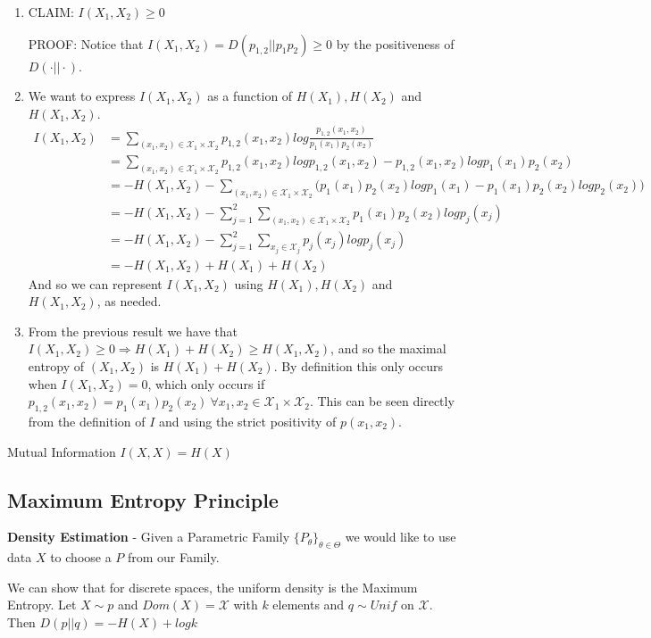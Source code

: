 \documentclass[]{article}
\begin{document}
\begin{enumerate}
	\item CLAIM: \(I(X_1,X_2)\ge 0\)
	
	PROOF: Notice that \(I(X_1,X_2) = D(p_{1,2}||p_1p_2) \ge 0\) by the positiveness of \(D(\cdot||\cdot)\).
	
	\item We want to express  \(I(X_1,X_2)\) as a function of \(H(X_1), H(X_2)\) and \(H(X_1,X_2)\).
	\begin{align*}
	I(X_1,X_2) &= \sum_{(x_1,x_2)\in\mathcal{X}_1\times\mathcal{X}_2}p_{1,2}(x_1,x_2)log\frac{p_{1,2}(x_1,x_2)}{p_1(x_1)p_2(x_2)} \\
	&=\sum_{(x_1,x_2)\in\mathcal{X}_1\times\mathcal{X}_2}p_{1,2}(x_1,x_2)logp_{1,2}(x_1,x_2)-p_{1,2}(x_1,x_2)logp_1(x_1)p_2(x_2)\\
	&=-H(X_1,X_2) - \sum_{(x_1,x_2)\in\mathcal{X}_1\times\mathcal{X}_2}\bigg( p_1(x_1)p_2(x_2)logp_1(x_1) - p_1(x_1)p_2(x_2)logp_2(x_2) \bigg) \\
	&=-H(X_1,X_2) - \sum_{j=1}^{2}\sum_{(x_1,x_2)\in\mathcal{X}_1\times\mathcal{X}_2}p_1(x_1)p_2(x_2)logp_j(x_j)\\
	&= -H(X_1,X_2) -\sum_{j=1}^{2}\sum_{x_j\in\mathcal{X}_j}p_j(x_j)logp_j(x_j)\\
	&= -H(X_1,X_2) + H(X_1) + H(X_2)
	\end{align*}
	And so we can represent \(I(X_1,X_2)\) using \(H(X_1), H(X_2)\) and \(H(X_1,X_2)\), as needed.
	\item From the previous result we have that \(I(X_1,X_2)\ge0 \Rightarrow H(X_1) + H(X_2) \ge H(X_1,X_2) \), and so the maximal entropy of \((X_1,X_2)\) is \(H(X_1) + H(X_2)\). By definition this only occurs when \(I(X_1,X_2)=0\), which only occurs if
	\(p_{1,2}(x_1,x_2)=p_1(x_1)p_2(x_2) \ \forall x_1,x_2 \in \mathcal{X}_1\times\mathcal{X}_2\). This can be seen directly from the definition of \(I\) and using the strict positivity of \(p(x_1,x_2)\).
\end{enumerate}


Mutual Information \(I(X,X) = H(X)\)

\subsection{Maximum Entropy Principle}
\textbf{Density Estimation} - Given a Parametric Family \(\{P_{\theta}\}_{\theta\in\Theta}\) we would like to use data \(X\) to choose a \(P\) from our Family.

We can show that for discrete spaces, the uniform density is the Maximum Entropy.
Let \(X \sim p\) and $Dom(X) = \mathcal{X}$ with $k$ elements and \(q\sim Unif\) on $\mathcal{X}$. Then \(D(p||q) = -H(X) + logk\)
\end{document}
